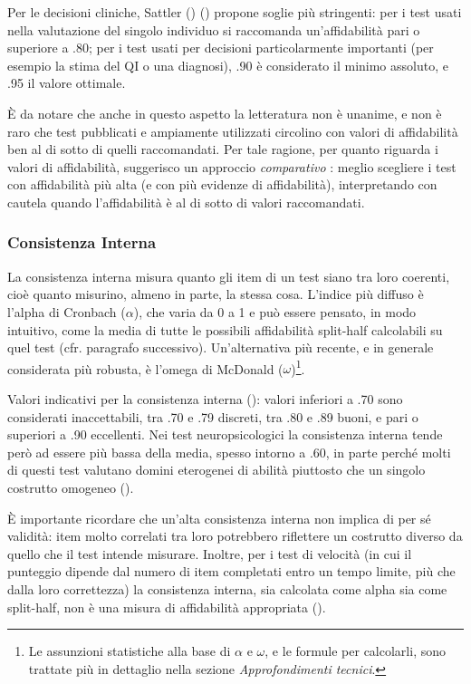 \documentclass[
  italian,
  letterpaper,
  paper=6in:9in,
  pagesize=pdftex,
  headinclude=on,
  footinclude=on,
  11pt]{scrbook}
\begin{document}
Per le decisioni cliniche, Sattler (\citeyear{sattler2001assessment})
(\cite{slick2006psychometrics}) propone soglie più stringenti: per i
test usati nella valutazione del singolo individuo si raccomanda
un'affidabilità pari o superiore a .80; per i test usati per decisioni
particolarmente importanti (per esempio la stima del QI o una diagnosi),
.90 è considerato il minimo assoluto, e .95 il valore ottimale.

È da notare che anche in questo aspetto la letteratura non è unanime, e
non è raro che test pubblicati e ampiamente utilizzati circolino con
valori di affidabilità ben al di sotto di quelli raccomandati. Per tale
ragione, per quanto riguarda i valori di affidabilità, suggerisco un
approccio \emph{comparativo} : meglio scegliere i test con affidabilità
più alta (e con più evidenze di affidabilità), interpretando con cautela
quando l'affidabilità è al di sotto di valori raccomandati.

\subsubsection{Consistenza Interna}\label{consistenza-interna}

La consistenza interna misura quanto gli item di un test siano tra loro
coerenti, cioè quanto misurino, almeno in parte, la stessa cosa.
L'indice più diffuso è l'alpha di Cronbach (\(\alpha\)), che varia da 0
a 1 e può essere pensato, in modo intuitivo, come la media di tutte le
possibili affidabilità split-half calcolabili su quel test (cfr.
paragrafo successivo). Un'alternativa più recente, e in generale
considerata più robusta, è l'omega di McDonald (\(\omega\))\footnote{Le
  assunzioni statistiche alla base di \(\alpha\) e \(\omega\), e le
  formule per calcolarli, sono trattate più in dettaglio nella sezione
  \emph{Approfondimenti tecnici}.}.

Valori indicativi per la consistenza interna
(\cite{slick2006psychometrics}): valori inferiori a .70 sono considerati
inaccettabili, tra .70 e .79 discreti, tra .80 e .89 buoni, e pari o
superiori a .90 eccellenti. Nei test neuropsicologici la consistenza
interna tende però ad essere più bassa della media, spesso intorno a
.60, in parte perché molti di questi test valutano domini eterogenei di
abilità piuttosto che un singolo costrutto omogeneo
(\cite{slick2006psychometrics}).

È importante ricordare che un'alta consistenza interna non implica di
per sé validità: item molto correlati tra loro potrebbero riflettere un
costrutto diverso da quello che il test intende misurare. Inoltre, per i
test di velocità (in cui il punteggio dipende dal numero di item
completati entro un tempo limite, più che dalla loro correttezza) la
consistenza interna, sia calcolata come alpha sia come split-half, non è
una misura di affidabilità appropriata (\cite{slick2006psychometrics}).
\end{document}
